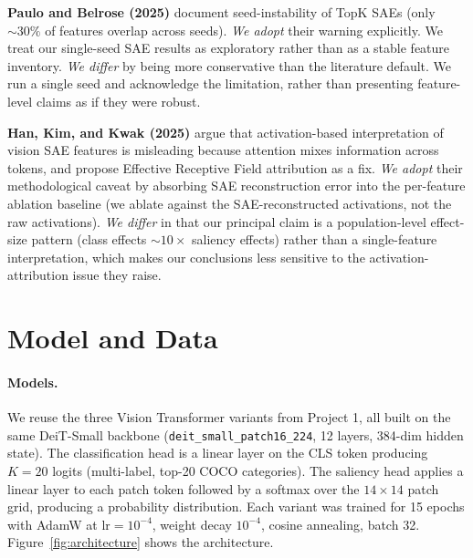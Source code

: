 \documentclass{article}
\begin{document}
\textbf{Paulo and Belrose (2025)} document seed-instability of TopK SAEs (only $\sim 30\%$ of features overlap across seeds). \emph{We adopt} their warning explicitly. We treat our single-seed SAE results as exploratory rather than as a stable feature inventory. \emph{We differ} by being more conservative than the literature default. We run a single seed and acknowledge the limitation, rather than presenting feature-level claims as if they were robust.

\textbf{Han, Kim, and Kwak (2025)} argue that activation-based interpretation of vision SAE features is misleading because attention mixes information across tokens, and propose Effective Receptive Field attribution as a fix. \emph{We adopt} their methodological caveat by absorbing SAE reconstruction error into the per-feature ablation baseline (we ablate against the SAE-reconstructed activations, not the raw activations). \emph{We differ} in that our principal claim is a population-level effect-size pattern (class effects $\sim 10\times$ saliency effects) rather than a single-feature interpretation, which makes our conclusions less sensitive to the activation-attribution issue they raise.

\section{Model and Data}

\paragraph{Models.}
We reuse the three Vision Transformer variants from Project 1, all built on the same DeiT-Small backbone (\texttt{deit\_small\_patch16\_224}, 12 layers, 384-dim hidden state). The classification head is a linear layer on the CLS token producing $K = 20$ logits (multi-label, top-20 COCO categories). The saliency head applies a linear layer to each patch token followed by a softmax over the $14 \times 14$ patch grid, producing a probability distribution. Each variant was trained for 15 epochs with AdamW at $\text{lr} = 10^{-4}$, weight decay $10^{-4}$, cosine annealing, batch 32. Figure~\ref{fig:architecture} shows the architecture.
\end{document}
